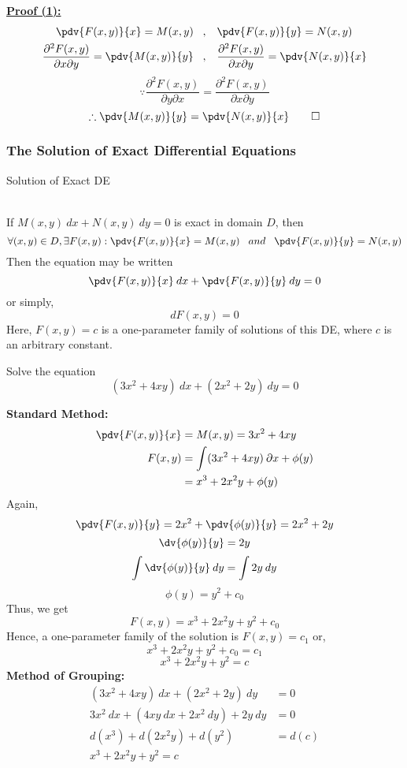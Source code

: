 \underline{\textbf{Proof (1):}}
\begin{align*}
    \pdv{F(x,y)}{x} = M(x,y) \;\;\;&,\;\;\; \pdv{F(x,y)}{y} = N(x,y)  \\
    \frac{\partial^2 F(x,y)}{\partial x \partial y} = \pdv{M(x,y)}{y} \;\;\;&,\;\;\; \frac{\partial^2 F(x,y)}{\partial x \partial y} = \pdv{N(x,y)}{x}
\end{align*}
\[
    \because \frac{\partial^2 F(x,y)}{\partial y \partial x} = \frac{\partial^2 F(x,y)}{\partial x \partial y}
\] \[
    \therefore \pdv{M(x,y)}{y} = \pdv{N(x,y)}{x} \qed
\]

 
\subsubsection{The Solution of Exact Differential Equations}

\begin{theorem}{Solution of Exact DE}
    
    \\If $M(x,y) \: d{x} + N(x,y) \: d{y} = 0$ is exact in domain $D$, then
    \[
        \forall(x,y)\in D, \exists F(x,y) : \pdv{F(x,y)}{x} = M(x,y) \;\;\;and\;\;\;
        \pdv{F(x,y)}{y} = N(x,y)
    \]
    Then the equation may be written \[
        \pdv{F(x,y)}{x} \: d{x} + \pdv{F(x,y)}{y} \: d{y} = 0
    \] or simply, \[
        dF(x,y) = 0
    \]
    Here, $F(x,y) = c$ is a one-parameter family of solutions of this DE, where $c$ is an arbitrary constant.
\end{theorem}

\begin{example}{Solve the equation \[
        (3x^2 + 4xy) \: d{x} + (2x^2 + 2y) \: d{y} = 0
\]}
    
    \textbf{Standard Method:}
    \begin{align*}
        \pdv{F(x,y)}{x} &= M(x,y) = 3x^2 + 4xy \\
        F(x,y) &= \int (3x^2 + 4xy) \: \partial{x} + \phi(y) \\
        &= x^3 + 2x^2y + \phi(y) \\
    \end{align*}
    Again, \[
        \pdv{F(x,y)}{y} = 2x^2 + \pdv{\phi(y)}{y} = 2x^2 + 2y
    \] \[
        \dv{\phi(y)}{y} = 2y
    \] \[
    \int \dv{\phi(y)}{y} \: d{y} = \int 2y \: d{y}
    \] \[
        \phi(y) = y^2 + c_0
    \]
    Thus, we get \[
        F(x,y) = x^3 + 2x^2y + y^2 + c_0
    \] Hence, a one-parameter family of the solution is $F(x,y) = c_1$ or, \[
        x^3 + 2x^2y + y^2 + c_0 = c_1
    \]\[
        \boxed{x^3 + 2x^2y + y^2 = c}
    \]
    \textbf{Method of Grouping:}
    \begin{align*}
        (3x^2 + 4xy) \: d{x} + (2x^2 + 2y) \: d{y} &= 0 \\
        3x^2 \: d{x} + (4xy \: d{x} + 2x^2 \: d{y}) + 2y \: d{y} &= 0 \\
        d(x^3) + d(2x^2y) + d(y^2) &= d(c) \\
        \boxed{x^3 + 2x^2y + y^2 = c}
    \end{align*}
\end{example}

